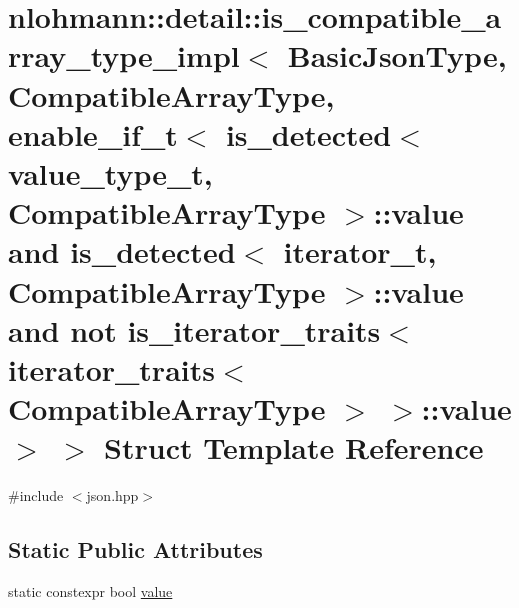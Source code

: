 \hypertarget{structnlohmann_1_1detail_1_1is__compatible__array__type__impl_3_01_basic_json_type_00_01_compati04c4671a9fa75002365be1949a74f972}{}\section{nlohmann\+::detail\+::is\+\_\+compatible\+\_\+array\+\_\+type\+\_\+impl$<$ Basic\+Json\+Type, Compatible\+Array\+Type, enable\+\_\+if\+\_\+t$<$ is\+\_\+detected$<$ value\+\_\+type\+\_\+t, Compatible\+Array\+Type $>$\+::value and is\+\_\+detected$<$ iterator\+\_\+t, Compatible\+Array\+Type $>$\+::value and not is\+\_\+iterator\+\_\+traits$<$ iterator\+\_\+traits$<$ Compatible\+Array\+Type $>$ $>$\+::value $>$ $>$ Struct Template Reference}
\label{structnlohmann_1_1detail_1_1is__compatible__array__type__impl_3_01_basic_json_type_00_01_compati04c4671a9fa75002365be1949a74f972}


{\ttfamily \#include $<$json.\+hpp$>$}

\subsection*{Static Public Attributes}
\begin{DoxyCompactItemize}
\item 
static constexpr bool \mbox{\hyperlink{structnlohmann_1_1detail_1_1is__compatible__array__type__impl_3_01_basic_json_type_00_01_compati04c4671a9fa75002365be1949a74f972_aa9bdf31f85ac3ee17180a008f1cb81f7}{value}}
\end{DoxyCompactItemize}


